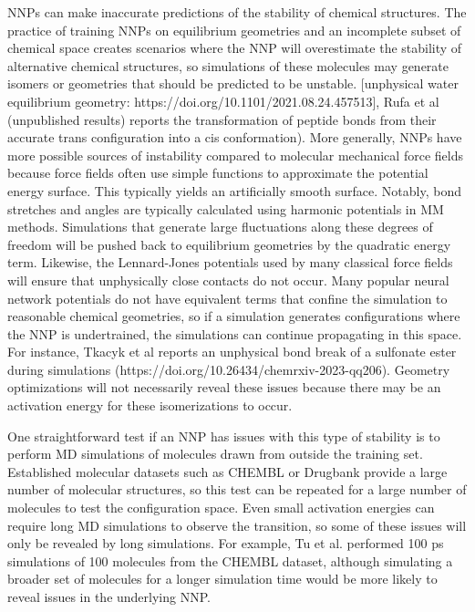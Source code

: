 \documentclass[9pt,bestpractices]{livecoms}
\begin{document}
NNPs can make inaccurate predictions of the stability of chemical structures. The practice of training NNPs on equilibrium geometries and an incomplete subset of chemical space creates scenarios where the NNP will overestimate the stability of alternative chemical structures, so simulations of these molecules may generate isomers or geometries that should be predicted to be unstable. [unphysical water equilibrium geometry: https://doi.org/10.1101/2021.08.24.457513], Rufa et al (unpublished results) reports the transformation of peptide bonds from their accurate trans configuration into a cis conformation). 
More generally, NNPs have more possible sources of instability compared to molecular mechanical force fields because force fields often use simple functions to approximate the potential energy surface. This typically yields an artificially smooth surface. Notably, bond stretches and angles are typically calculated using harmonic potentials in MM methods. Simulations that generate large fluctuations along these degrees of freedom will be pushed back to equilibrium geometries by the quadratic energy term. Likewise, the Lennard-Jones potentials used by many classical force fields will ensure that unphysically close contacts do not occur. Many popular neural network potentials do not have equivalent terms that confine the simulation to reasonable chemical geometries, so if a simulation generates configurations where the NNP is undertrained, the simulations can continue propagating in this space. For instance, Tkacyk et al reports an unphysical bond break of a sulfonate ester during simulations (https://doi.org/10.26434/chemrxiv-2023-qq206). Geometry optimizations will not necessarily reveal these issues because there may be an activation energy for these isomerizations to occur. 

One straightforward test if an NNP has issues with this type of stability is to perform MD simulations of molecules drawn from outside the training set. Established molecular datasets such as CHEMBL or Drugbank provide a large number of molecular structures, so this test can be repeated for a large number of molecules to test the configuration space. Even small activation energies can require long MD simulations to observe the transition, so some of these issues will only be revealed by long simulations. For example, Tu et al. performed 100 ps simulations of 100 molecules from the CHEMBL dataset, although simulating a broader set of molecules for a longer simulation time would be more likely to reveal issues in the underlying NNP. 
\end{document}
